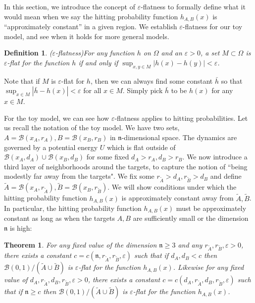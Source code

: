 \documentclass[english, aip, jcp, priprint, graphicx,floatfix]{revtex4-1}
\newtheorem{definition}{Definition}
\newtheorem{theorem}{Theorem}
\theoremstyle{plain}
\theoremstyle{definition}
\theoremstyle{plain}
\newcommand{\dimension}{{\mathfrak{n}}}
\newcommand{\bb}[1]{\mathcal{B}\left(#1\right)}
\begin{document}
In this section, we introduce the concept of $\varepsilon$-flatness to formally define what it would mean when we say the hitting probability function $h_{A, B}(x)$ is ``approximately constant'' in a given region. We establish $\varepsilon$-flatness for our toy model, and see when it holds for more general models.
%
\begin{definition}($\varepsilon$-flatness)\label{def:epsilon_flat}
For any function $h$ on $\Omega$ and an $\varepsilon > 0$, a set $M\subset \Omega$ is $\varepsilon$-flat for the function $h$ if and only if $\sup_{x, y \in M} | h (x) - h (y) | < \varepsilon$.
\end{definition}
%
Note that if $M$ is $\varepsilon$-flat for $h$, then we can always find some constant $\bar h$ so that $\sup_{x \in M}|\bar h-h(x)|<\varepsilon$ for all $x\in M$.  Simply pick $\bar h$ to be $h(x)$ for any $x\in M$.  

For the toy model, we can see how  $\varepsilon$-flatness applies to hitting probabilities.  Let us recall the notation of the toy model.  We have two sets, $A=\bb{x_A,r_A},B=\bb{x_B,r_B}$ in $\dimension$-dimensional space.  The dynamics are governed by a potential energy $U$ which is flat outside of $\bb{x_A,d_A}\cup\bb{x_B,d_B}$ for some fixed $d_A>r_A,d_B>r_B$.  We now introduce a third layer of neighborhoods around the targets, to capture the notion of ``being modestly far away from the targets".  We fix some $r_{\tilde A}>d_A,r_{\tilde B}>d_B$ and define $\tilde A=\bb{x_A,r_{\tilde A}},\tilde B=\bb{x_B,r_{\tilde B}}$.  We will show conditions under which the hitting probability function $h_{A, B}(x)$ is approximately constant away from $\tilde A,\tilde B$.  In particular, the hitting probability function $h_{A, B}(x)$ must be approximately constant as long as when the targets $A, B$ are sufficiently small or the dimension $\dimension$ is high:

\begin{theorem}\label{thm:epsilon_flat}
For any fixed value of the dimension $\dimension \geq 3$ and any $r_{\tilde{A}}, r_{\tilde{B}}, \varepsilon > 0$, there exists a constant $c=c(\dimension, r_{\tilde{A}}, r_{\tilde{B}}, \varepsilon)$ such that if $d_{A}, d_{B} < c$ then $\bb {0, 1} / (\tilde{A} \cup \tilde{B})$ is $\varepsilon$-flat for the function $h_{A,B}(x)$.  Likewise for any fixed value of $d_{A}, r_{\tilde{A}}, d_{B}, r_{\tilde{B}}, \varepsilon>0$, there exists a constant $c=c(d_{A}, r_{\tilde{A}}, d_{B}, r_{\tilde{B}}, \varepsilon)$ such that if $\dimension \geq c$ then $\bb {0, 1} / (\tilde{A} \cup \tilde{B})$ is $\varepsilon$-flat for the function $h_{A,B}(x)$.
\end{theorem}
\end{document}
